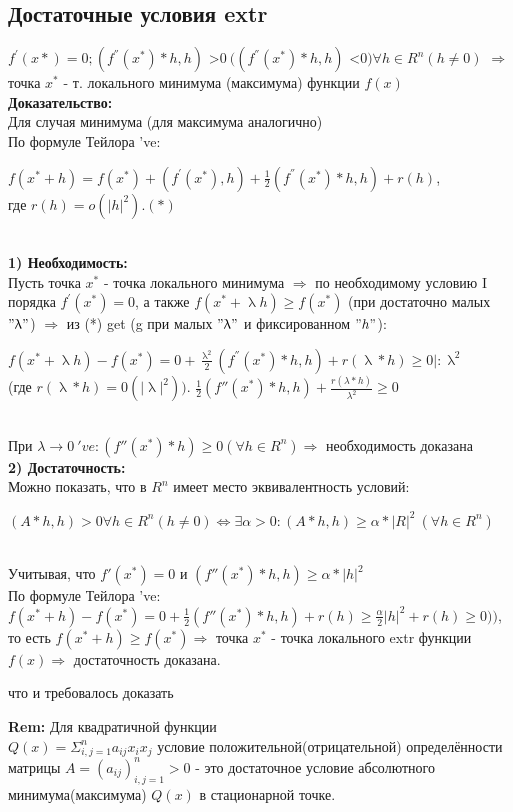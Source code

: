 \documentclass[a4paper]{article}
\newcommand{\cent}[1]{\begin{center}{#1}\end{center}} %
\begin{document}
\subsection*{Достаточные условия extr} $f^{'}(x*)=0; (f^{''}(x^*)*h, h)$ \textgreater $0 \ ((f^{''}(x^*)*h, h)$ \textless $0) \forall h \in R^n (h \neq 0)$ $\Rightarrow $ точка $x^*$ - т. локального минимума (максимума) функции $f(x)$\\
\textbf{Доказательство:} \\
Для случая минимума (для максимума аналогично) \\
По формуле Тейлора 've:
\cent{$f(x^*+h) = f(x^*) + (f^{'} (x^*), h) + \frac{1}{2}(f^{''}(x^*)*h, h) + r(h)$,\\ где $r(h)=o(|h|^2). (*)$} \\
\textbf{1) Необходимость:} \\
Пусть точка $x^*$ - точка локального минимума $\Rightarrow$ по необходимому условию I порядка $f^{'}(x^*)=0$, а также $f(x^* + \uplambda h) \geq f(x^*)$ (при достаточно малых $"\uplambda"$) $\Rightarrow$ из (*) get (g при малых $"\uplambda"$ и фиксированном $"h"$):
\cent{$f(x^{*}+\uplambda h) - f(x^*) = 0 + \frac{\uplambda^2}{2} (f^{''}(x^*)*h, h) + r( \uplambda*h) \geq 0 |: \uplambda^2$\\
(где $r( \uplambda*h) =0 (|\uplambda|^2)).$ 
$\frac{1}{2}(f''(x^*)*h, h)+\frac{r(\lambda *h)}{\lambda^2} \geq 0$}\\
При $\lambda \rightarrow 0 \ 've: (f''(x^*)*h)\geq 0 (\forall h \in R^n) \Rightarrow $ необходимость доказана \\
\textbf{2) Достаточность:}\\
Можно показать, что в $R^n$ имеет место эквивалентность условий:
\cent{$(A*h, h)>0 \forall h \in R^n (h \neq 0) \Leftrightarrow \exists \alpha > 0: (A*h, h) \geq \alpha*|R|^2 \ (\forall h \in R^n)$}\\
Учитывая, что $f'(x^*)=0$ и $(f''(x^*)*h,h)\geq \alpha * |h|^2$\\
По формуле Тейлора 've:\\
$f(x^*+h)-f(x^*)=0+\frac{1}{2}(f''(x^*)*h,h)+r(h)\geq \frac{\alpha}{2}|h|^2+r(h) \geq 0))$, то есть $f(x^*+h) \geq f(x^*) \Rightarrow$ точка $x^*$ - точка локального extr функции $f(x) \Rightarrow$ достаточность доказана.
\begin{center}
что и требовалось доказать
\end{center}
\textbf{Rem:} 
Для квадратичной функции\\
$Q(x)=\Sigma^n_{i,j=1} a_{ij}x_i x_j$ условие положительной(отрицательной) определённости матрицы $A=(a_{ij})^n_{i,j=1}>0$ - это достаточное условие абсолютного минимума(максимума) $Q(x)$ в стационарной точке.
\newpage
\end{document}
